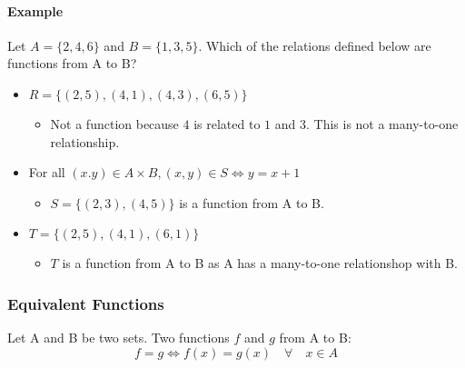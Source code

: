 \paragraph*{Example}
Let  $A = \{2,4,6\}$ and $B = \{1,3,5\}$. Which of the relations defined below are functions from A to B?
\begin{itemize}
    \item $R = \{(2, 5), (4, 1), (4, 3), (6, 5)\}$
    \begin{itemize}
        \item Not a function because $4$ is related to $1$ and $3$. This is not a many-to-one relationship.
    \end{itemize}

    \item For all $(x.y) \in A \times B, (x,y) \in S \iff y = x + 1$
    \begin{itemize}
        \item $S = \{(2,3), (4,5)\}$ is a function from A to B.
    \end{itemize}

    \item $T = \{(2,5),(4,1),(6,1)\}$
    \begin{itemize}
        \item $T$ is a function from A to B as A has a many-to-one relationshop with B.
    \end{itemize}
\end{itemize}

\subsubsection*{Equivalent Functions}
Let A and B be two sets. Two functions $f$ and $g$ from A to B:
\begin{equation*}
    f = g \iff f(x) = g(x) \quad \forall \quad x \in A
\end{equation*}